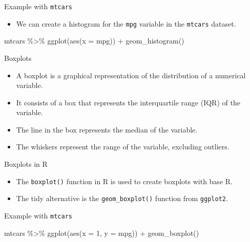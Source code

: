 \documentclass[
  10pt,
  ignorenonframetext,
]{beamer}
\newenvironment{Shaded}{\begin{snugshade}}{\end{snugshade}}
\newcommand{\AttributeTok}[1]{\textcolor[rgb]{0.40,0.45,0.13}{#1}}
\newcommand{\DecValTok}[1]{\textcolor[rgb]{0.68,0.00,0.00}{#1}}
\newcommand{\FunctionTok}[1]{\textcolor[rgb]{0.28,0.35,0.67}{#1}}
\newcommand{\NormalTok}[1]{\textcolor[rgb]{0.00,0.23,0.31}{#1}}
\newcommand{\SpecialCharTok}[1]{\textcolor[rgb]{0.37,0.37,0.37}{#1}}
\providecommand{\tightlist}{%
  \setlength{\itemsep}{0pt}\setlength{\parskip}{0pt}}\usepackage{longtable,booktabs,array}
\begin{document}
\begin{frame}[fragile]{Example with \texttt{mtcars}}
\label{example-with-mtcars-3}
\begin{itemize}
\tightlist
\item
  We can create a histogram for the \texttt{mpg} variable in the
  \texttt{mtcars} dataset.
\end{itemize}

\begin{Shaded}
\begin{Highlighting}[]
\NormalTok{mtcars }\SpecialCharTok{\%\textgreater{}\%} 
    \FunctionTok{ggplot}\NormalTok{(}\FunctionTok{aes}\NormalTok{(}\AttributeTok{x =}\NormalTok{ mpg)) }\SpecialCharTok{+}
    \FunctionTok{geom\_histogram}\NormalTok{()}
\end{Highlighting}
\end{Shaded}
\end{frame}

\begin{frame}{Boxplots}
\label{boxplots}
\begin{itemize}
\item
  A boxplot is a graphical representation of the distribution of a
  numerical variable.
\item
  It consists of a box that represents the interquartile range (IQR) of
  the variable.
\item
  The line in the box represents the median of the variable.
\item
  The whiskers represent the range of the variable, excluding outliers.
\end{itemize}
\end{frame}

\begin{frame}[fragile]{Boxplots in R}
\label{boxplots-in-r}
\begin{itemize}
\item
  The \texttt{boxplot()} function in R is used to create boxplots with
  base R.
\item
  The tidy alternative is the \texttt{geom\_boxplot()} function from
  \texttt{ggplot2}.
\end{itemize}
\end{frame}

\begin{frame}[fragile]{Example with \texttt{mtcars}}
\label{example-with-mtcars-4}
\begin{Shaded}
\begin{Highlighting}[]
\NormalTok{mtcars }\SpecialCharTok{\%\textgreater{}\%} 
    \FunctionTok{ggplot}\NormalTok{(}\FunctionTok{aes}\NormalTok{(}\AttributeTok{x =} \DecValTok{1}\NormalTok{, }\AttributeTok{y =}\NormalTok{ mpg)) }\SpecialCharTok{+}
    \FunctionTok{geom\_boxplot}\NormalTok{()}
\end{Highlighting}
\end{Shaded}
\end{frame}
\end{document}
